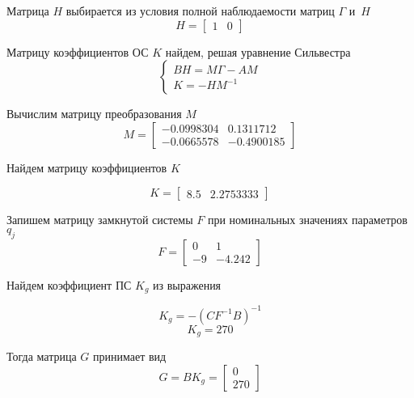 Матрица $H$ выбирается из условия полной наблюдаемости матриц $\Gamma$ и~$H$
\begin{equation}
	H = 
	\begin{bmatrix}
	1 & 0
	\end{bmatrix}
\end{equation}

Матрицу коэффициентов ОС $K$ найдем, решая уравнение Сильвестра 
\begin{equation}
	\begin{cases}
	 B H = M \Gamma - A M\\
	 K = - H M^{-1}
	\end{cases}
\end{equation}

Вычислим матрицу преобразования $M$
\begin{equation}
	M = 
	\begin{bmatrix}
	  - 0.0998304 &   0.1311712\\
	  - 0.0665578 & - 0.4900185  	
	\end{bmatrix}
\end{equation}

Найдем матрицу коэффициентов $K$

\begin{equation}\label{Kq}
	K = 
	\begin{bmatrix}
	 8.5  &  2.2753333
	\end{bmatrix}
\end{equation}

Запишем матрицу замкнутой системы $F$ при номинальных значениях параметров $q_j$
\begin{equation}
	F = 
	\begin{bmatrix}
	   0 &    1\\     
	- 9&  - 4.242
	\end{bmatrix}
\end{equation}

Найдем коэффициент ПС $K_g$ из выражения

\begin{equation}
	K_g = - (C F^{-1} B)^{-1}
\end{equation}
\begin{equation}
	K_g = 270
\end{equation}

Тогда матрица $G$ принимает вид
\begin{equation}
	G = B K_g = 
	\begin{bmatrix}
	0\\ 
	270
	\end{bmatrix}
\end{equation}

